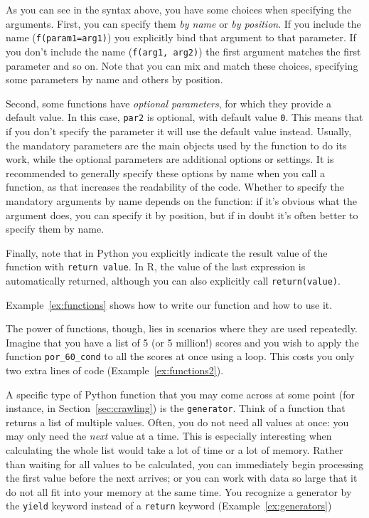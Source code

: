 As you can see in the syntax above, you have some choices when specifying the arguments.
First, you can specify them \emph{by name} or \emph{by position}.
If you include the name (\verb|f(param1=arg1)|) you explicitly bind that argument to that parameter.
If you don't include the name (\verb|f(arg1, arg2)|) the first argument matches the first parameter and so on.
Note that you can mix and match these choices, specifying some parameters by name and others by position.

Second, some functions have \emph{optional parameters}, for which they provide a default value.
In this case, \verb|par2| is optional, with default value \verb|0|.
This means that if you don't specify the parameter it will use the default value instead.
Usually, the mandatory parameters are the main objects used by the function to do its work,
while the optional parameters are additional options or settings.
It is recommended to generally specify these options by name when you call a function,
as that increases the readability of the code.
Whether to specify the mandatory arguments by name depends on the function:
if it's obvious what the argument does, you can specify it by position,
but if in doubt it's often better to specify them by name. 

Finally, note that in Python you explicitly indicate the result value of the function with
\verb|return value|.
In R, the value of the last expression is automatically returned,
although you can also explicitly call \verb|return(value)|. 

Example~\ref{ex:functions} shows how to write our function and how to use it.

The power of functions, though, lies in scenarios where they are used
repeatedly.  Imagine that you have a list of 5 (or 5 million!) scores
and you wish to apply the function \verb|por_60_cond| to all the scores at
once using a loop. This costs you only two extra lines of code
(Example~\ref{ex:functions2}).



\begin{feature}
  A specific type of Python function that you may come across at some point (for instance, in Section~\ref{sec:crawling}) is the \texttt{generator}. 
  Think of a function that returns a list of multiple values. Often, you do not need all values at once: you may only 
  need the \emph{next} value at a time. This is especially interesting when calculating the whole list would take a lot of time or a lot 
  of memory. Rather than waiting for all values to be calculated, you can immediately begin processing the first value before the next arrives; or 
  you can work with data so large that it do not all fit into your memory at the same time.  You recognize a generator by 
  the \verb|yield| keyword instead of a \verb|return| keyword (Example~\ref{ex:generators})
\end{feature}

